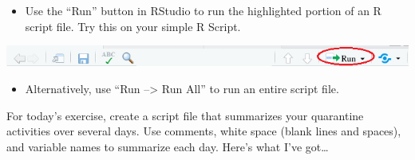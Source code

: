 \documentclass[
]{book}
\newenvironment{Shaded}{\begin{snugshade}}{\end{snugshade}}
\newcommand{\CharTok}[1]{\textcolor[rgb]{0.31,0.60,0.02}{#1}}
\newcommand{\CommentTok}[1]{\textcolor[rgb]{0.56,0.35,0.01}{\textit{#1}}}
\newcommand{\KeywordTok}[1]{\textcolor[rgb]{0.13,0.29,0.53}{\textbf{#1}}}
\newcommand{\NormalTok}[1]{#1}
\newcommand{\StringTok}[1]{\textcolor[rgb]{0.31,0.60,0.02}{#1}}
\providecommand{\tightlist}{%
  \setlength{\itemsep}{0pt}\setlength{\parskip}{0pt}}
\begin{document}
\begin{itemize}
\tightlist
\item
  Use the ``Run'' button in RStudio to run the highlighted portion of an R script file. Try this on your simple R Script.
\end{itemize}

\begin{center}\includegraphics[width=0.8\linewidth]{images/rstudio_run_button} \end{center}

\begin{Shaded}
\end{Shaded}

\begin{itemize}
\tightlist
\item
  Alternatively, use ``Run --\textgreater{} Run All'' to run an entire script file.
\end{itemize}

For today's exercise, create a script file that summarizes your quarantine activities over several days. Use comments, white space (blank lines and spaces), and variable names to summarize each day. Here's what I've got\ldots{}
\end{document}
